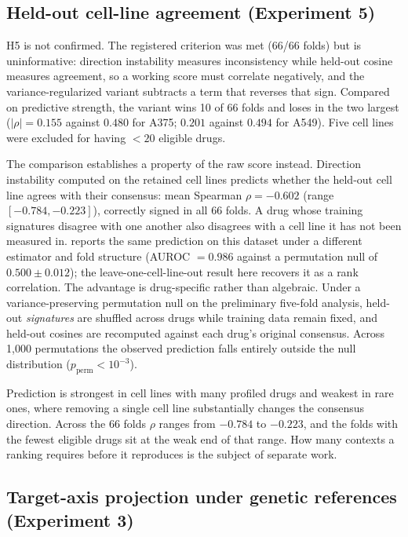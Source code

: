 \documentclass[11pt]{article}
\begin{document}
\subsection{Held-out cell-line agreement (Experiment 5)}
\label{sec:exp5}

H5 is not confirmed. The registered criterion was met (66/66 folds) but
is uninformative: direction instability measures inconsistency while
held-out cosine measures agreement, so a working score must correlate
negatively, and the variance-regularized variant subtracts a term that
reverses that sign. Compared on predictive strength, the variant wins 10
of 66 folds and loses in the two largest ($|\rho| = 0.155$ against
$0.480$ for A375; $0.201$ against $0.494$ for A549). Five cell lines were
excluded for having $< 20$ eligible drugs.

The comparison establishes a property of the raw score instead. Direction
instability computed on the retained cell lines predicts whether the
held-out cell line agrees with their consensus: mean Spearman
$\rho = -0.602$ (range $[-0.784, -0.223]$), correctly signed in all 66
folds. A drug whose training signatures disagree with one another also
disagrees with a cell line it has not been measured in.
\citet{tower2026drug} reports the same prediction on this dataset under a
different estimator and fold structure (AUROC $= 0.986$ against a permutation
null of $0.500 \pm 0.012$); the leave-one-cell-line-out result here recovers it
as a rank correlation.
The advantage is drug-specific rather than algebraic. Under a
variance-preserving permutation null on the preliminary five-fold analysis,
held-out \emph{signatures} are shuffled across drugs while training data
remain fixed, and held-out cosines are recomputed against each drug's
original consensus. Across 1{,}000 permutations the observed prediction
falls entirely outside the null distribution
($p_{\text{perm}} < 10^{-3}$).

Prediction is strongest in cell lines with many profiled drugs and weakest
in rare ones, where removing a single cell line substantially changes the
consensus direction. Across the 66 folds $\rho$ ranges from $-0.784$ to
$-0.223$, and the folds with the fewest eligible drugs sit at the weak end
of that range. How many contexts a ranking requires before it reproduces is
the subject of separate work.


\subsection{Target-axis projection under genetic references (Experiment 3)}
\end{document}
